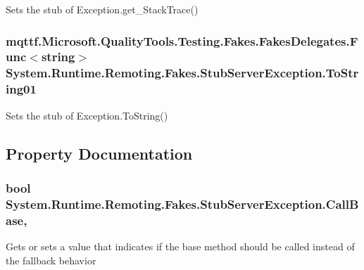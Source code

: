 Sets the stub of Exception.\-get\-\_\-\-Stack\-Trace()

\hypertarget{class_system_1_1_runtime_1_1_remoting_1_1_fakes_1_1_stub_server_exception_a62283f218e17622d12e7b4620a927c96}{
\subsubsection[{To\-String01}]{\setlength{\rightskip}{0pt plus 5cm}mqttf.\-Microsoft.\-Quality\-Tools.\-Testing.\-Fakes.\-Fakes\-Delegates.\-Func$<$string$>$ System.\-Runtime.\-Remoting.\-Fakes.\-Stub\-Server\-Exception.\-To\-String01}}\label{class_system_1_1_runtime_1_1_remoting_1_1_fakes_1_1_stub_server_exception_a62283f218e17622d12e7b4620a927c96}


Sets the stub of Exception.\-To\-String()



\subsection{Property Documentation}
\hypertarget{class_system_1_1_runtime_1_1_remoting_1_1_fakes_1_1_stub_server_exception_a61c580cd4e86ae9482a8a7b338294184}{
\subsubsection[{Call\-Base}]{\setlength{\rightskip}{0pt plus 5cm}bool System.\-Runtime.\-Remoting.\-Fakes.\-Stub\-Server\-Exception.\-Call\-Base\hspace{0.3cm}{\ttfamily [get]}, {\ttfamily [set]}}}\label{class_system_1_1_runtime_1_1_remoting_1_1_fakes_1_1_stub_server_exception_a61c580cd4e86ae9482a8a7b338294184}


Gets or sets a value that indicates if the base method should be called instead of the fallback behavior

